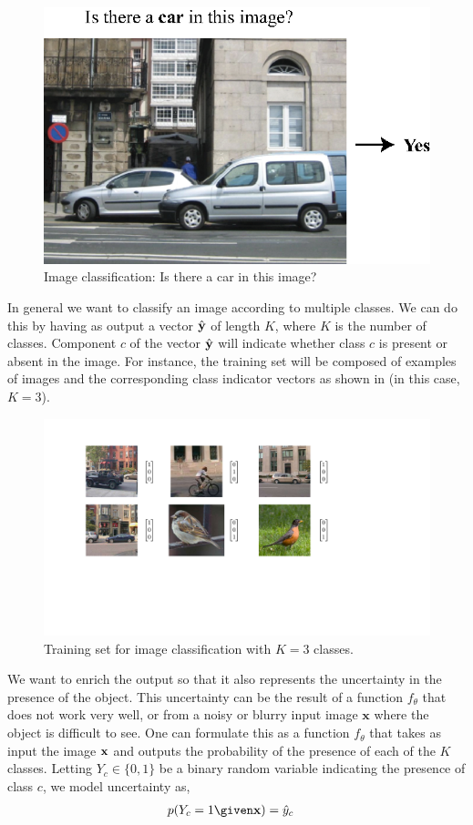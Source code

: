 \begin{figure}
\centerline{
\includegraphics[width=0.5\linewidth]{figures/object_recognition/image_classification.eps}}
\caption{Image classification: Is there a car in this image?}
\end{figure}


In general we want to classify an image according to multiple classes. We can do this by having as output a vector $\hat {\bf y}$ of length $K$, where $K$ is the number of classes. Component $c$ of the vector $\hat {\bf y}$ will indicate whether class $c$ is present or absent in the image. For instance, the training set will be composed of examples of images and the corresponding class indicator vectors as shown in \fig{\ref{fig:classification_training_set}} (in this case, $K=3$).

\begin{figure}
\centerline{
\includegraphics[width=1\linewidth]{figures/object_recognition/classification_training_set_v2.pdf}
}
\caption{Training set for image classification with $K=3$ classes.}
\label{fig:classification_training_set}
\end{figure}

We want to enrich the output so that it also represents the uncertainty in the presence of the object. This uncertainty can be the result of a function $f_{\theta}$ that does not work very well, or from a noisy or blurry input image $\mathbf{x}$ where the object is difficult to see. One can formulate this as a function $f_{\theta}$ that takes as input the image ${\bf x}$ and outputs the probability of the presence of each of the $K$ classes. Letting $Y_c \in \{0,1\}$ be a binary random variable indicating the presence of class $c$, we model uncertainty as,
\begin{align}
    p(Y_c=1 \given \mathbf{x}) &= \hat{y}_c \label{eqn:object_recognition:classification_probability_model}
\end{align}

